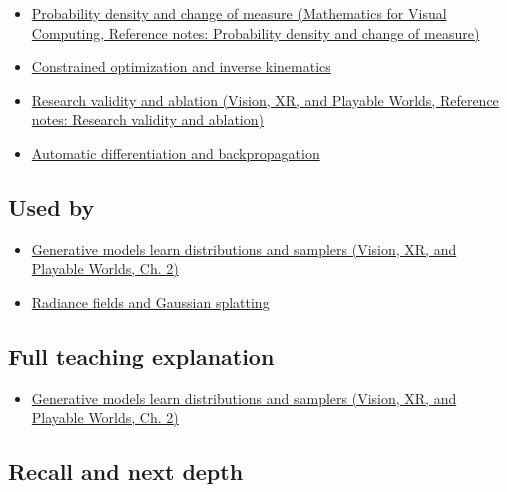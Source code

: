 \begin{itemize}
\tightlist
\item
  \href{../02-Mathematics-for-Visual-Computing/main.pdf\#nameddest=appendix-4815cd87ab8b}{Probability density and change of measure (Mathematics for Visual Computing, Reference notes: Probability density and change of measure)}
\item
  \hyperref[appendix-29f4bea4c2bb]{Constrained optimization and inverse kinematics}
\item
  \href{../07-Vision-XR-and-Playable-Worlds/main.pdf\#nameddest=appendix-65788587ef78}{Research validity and ablation (Vision, XR, and Playable Worlds, Reference notes: Research validity and ablation)}
\item
  \hyperref[appendix-40df0855b4a7]{Automatic differentiation and backpropagation}
\end{itemize}

\subsection{Used by}\label{appendix-2c568f05ee34-used-by}

\begin{itemize}
\tightlist
\item
  \href{../07-Vision-XR-and-Playable-Worlds/main.pdf\#nameddest=04-visual-computing-ii-ch031-generative-models-learn-distributions-and-samplers}{Generative models learn distributions and samplers (Vision, XR, and Playable Worlds, Ch. 2)}
\item
  \hyperref[appendix-c5b332e400e7]{Radiance fields and Gaussian splatting}
\end{itemize}

\subsection{Full teaching explanation}\label{appendix-2c568f05ee34-full-teaching-explanation}

\begin{itemize}
\tightlist
\item
  \href{../07-Vision-XR-and-Playable-Worlds/main.pdf\#nameddest=04-visual-computing-ii-ch031-generative-models-learn-distributions-and-samplers}{Generative models learn distributions and samplers (Vision, XR, and Playable Worlds, Ch. 2)}
\end{itemize}

\subsection{Recall and next depth}\label{appendix-2c568f05ee34-recall-and-next-depth}

